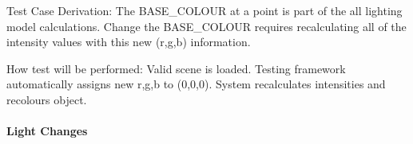 \documentclass[12pt, titlepage]{article}
\begin{document}
\begin{enumerate}
	Test Case Derivation: The BASE\_COLOUR at a point is part 
	of the all lighting model calculations. Change the BASE\_COLOUR requires 
	recalculating all of the intensity values with this new (r,g,b) information.
	
	How test will be performed: Valid scene is loaded. Testing framework 
	automatically assigns new r,g,b to (0,0,0). System recalculates 
	intensities and recolours object.			

%	
%	
%	
%	
%	
%	

%	
%	
%	
%	
%	
			
\end{enumerate}

\paragraph{Light Changes}
\end{document}
